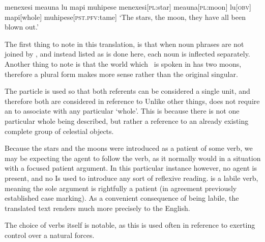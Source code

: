 \ex
\begingl
\glpreamble menexesi meauna lu mapi muhipese
\endpreamble
\nogloss{\lbrack}
menexesi[\textsc{pl:}star]
meauna[\textsc{pl:}moon]
lu[\textsc{obv}]
mapi[whole]
\nogloss{\rbrack}
muhipese[\textsc{pst.pfv:}tame]
\glft `The stars, the moon, they have all been blown out.'\\
\endgl
\xe

The first thing to note in this translation, is that when noun phrases are not joined by , and instead listed as is done here, each noun is inflected separately.
Another thing to note is that the world which \langname\ is spoken in has two moons, therefore a plural form makes more sense rather than the original singular.

The particle  is used so that both referents can be considered a single unit, and therefore both are considered in reference to 
Unlike other things,  does not require an  to associate  with any particular `whole'.
This is because there is not one particular whole being described, but rather a reference to an already existing complete group of celestial objects.

Because the stars and the moons were introduced as a patient of some verb, we may be expecting the agent to follow the verb, as it normally would in a situation with a focused patient argument.
In this particular instance however, no agent is present, and no  Is used to introduce any sort of reflexive reading.
 is a labile verb, meaning the sole argument is rightfully a patient (in agreement previously established case marking).
As a convenient consequence of  being labile, the translated text renders much more precisely to the English.

The choice of verbs itself is notable, as this is used often in reference to exerting control over a natural forces.